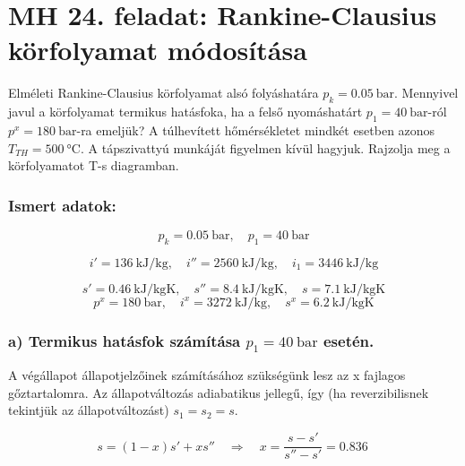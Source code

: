 \section*{MH 24. feladat: Rankine-Clausius körfolyamat módosítása}

Elméleti Rankine-Clausius körfolyamat alsó folyáshatára $p_k = \SI{0,05}{\bar}$. Mennyivel javul a körfolyamat termikus hatásfoka, ha a felső nyomáshatárt $p_1 = \SI{40}{\bar}$-ról $p^x = \SI{180}{\bar}$-ra emeljük? A túlhevített hőmérsékletet mindkét esetben azonos $T_{TH} = \SI{500}{\celsius}$. A tápszivattyú munkáját figyelmen kívül hagyjuk. Rajzolja meg a körfolyamatot T-s diagramban.

\subsubsection{Ismert adatok:}

\begin{equation*}
	p_k = \SI{0,05}{\bar},
	\quad
	p_1 = \SI{40}{\bar}	
\end{equation*}

\begin{equation*}
	i' = \SI{136}{\kilo\joule\per\kilogram},
	\quad
	i'' = \SI{2560}{\kilo\joule\per\kilogram},
	\quad
	i_1 = \SI{3446}{\kilo\joule\per\kilogram}
\end{equation*}

\begin{equation*}
	s' = \SI{0,46}{\kilo\joule\per\kilogram\kelvin},
	\quad
	s'' = \SI{8,4}{\kilo\joule\per\kilogram\kelvin},
	\quad
	s = \SI{7,1}{\kilo\joule\per\kilogram\kelvin}
\end{equation*}
\begin{equation*}
	p^x = \SI{180}{\bar},
	\quad
	i^x = \SI{3272}{\kilo\joule\per\kilogram},
	\quad
	s^x = \SI{6,2}{\kilo\joule\per\kilogram\kelvin}
\end{equation*}


\subsubsection*{a) Termikus hatásfok számítása $p_1=\SI{40}{\bar}$ esetén.}

A végállapot állapotjelzőinek számításához szükségünk lesz az x fajlagos gőztartalomra. Az állapotváltozás adiabatikus jellegű, így (ha reverzibilisnek tekintjük az állapotváltozást) $s_1 = s_2 = s $.

\begin{equation}
	s = \left(1 - x\right) s' + x s''
	\quad 
	\Rightarrow
	\quad 
	x =	\dfrac{s - s'}{s'' - s'} = \SI{0,836}{}
\end{equation}


